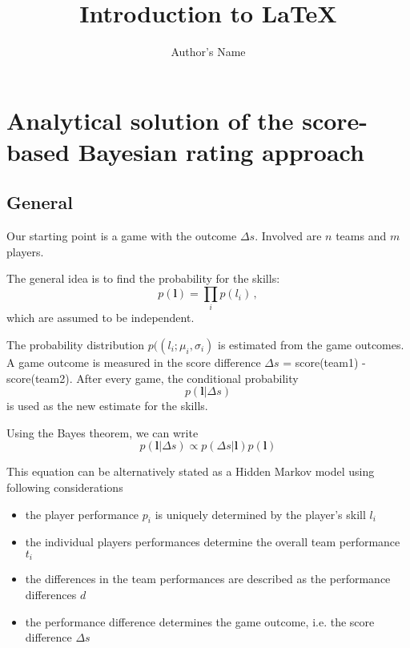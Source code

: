 \documentclass{article}
\begin{document}
\title{Introduction to \LaTeX{}}
\author{Author's Name}



\section{Analytical solution of the score-based Bayesian rating approach}



\subsection{General}

Our starting point is a game with the outcome $\Delta s$. Involved are $n$ teams and $m$ players. 


The general idea is to find the probability for the skills: 
\begin{equation}
p(\mathbf{l}) = \prod_i p(l_i)\, ,
\end{equation}
which are assumed to be independent. 


The probability  distribution $p((l_i;\mu_i,\sigma_i)$ is estimated from the game outcomes. A game outcome is measured in the score difference $\Delta s$ = score(team1) - score(team2). After every game, the conditional probability 
\begin{equation}
p(\mathbf{l} | \Delta s) 
\end{equation}
is used as the new estimate for the skills.

Using the Bayes theorem, we can write
\begin{equation}
p(\mathbf{l} | \Delta s) \propto p( \Delta s | \mathbf{l} ) p(\mathbf{l})
\end{equation}

This equation can be alternatively stated as a Hidden Markov model using following considerations
\begin{itemize}
\item the player performance $p_i$ is uniquely determined by the player's skill $l_i$
\item the individual players performances determine the overall team performance $t_i$
\item the differences in the team performances are described as the performance differences $d$
\item the performance difference determines the game outcome, i.e. the score difference $\Delta s$
\end{itemize}
\end{document}
